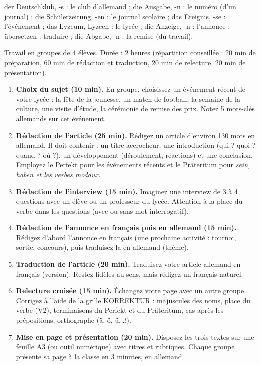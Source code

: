 \documentclass[11pt]{article}
\newcommand{\cle}[1]{{\popxbold\color{popdark}#1}}
\newcounter{popsec}
\newcounter{popsub}
\newcommand{\courssub}[1]{%
  \stepcounter{popsub}%
  \par\vspace{9pt}\noindent{\popxbold\fontsize{11.5}{13}\selectfont\color{popink}{\color{poporange}\thepopsec.\thepopsub}\hspace{6pt}#1}\par\nopagebreak\vspace{4pt}
}
\newcommand{\all}[1]{\ifmmode\text{\textit{#1}}\else\begingroup\selectlanguage{ngerman}\itshape #1\endgroup\fi}
\begin{document}
\begin{definition}
der Deutschklub, -s : le club d'allemand ; die Ausgabe, -n : le numéro (d'un journal) ; die Schülerzeitung, -en : le journal scolaire ; das Ereignis, -se : l'événement ; das Lyzeum, Lyzeen : le lycée ; die Anzeige, -n : l'annonce ; übersetzen : traduire ; die Abgabe, -n : la remise (du travail).
\end{definition}

\courssub{Consignes}

Travail en groupes de 4 élèves. Durée : 2 heures (répartition conseillée : 20 min de préparation, 60 min de rédaction et traduction, 20 min de relecture, 20 min de présentation).

\begin{enumerate}
\item \textbf{Choix du sujet (10 min).} En groupe, choisissez un événement récent de votre lycée : la fête de la jeunesse, un match de football, la semaine de la culture, une visite d'étude, la cérémonie de remise des prix. Notez 5 mots-clés allemands sur cet événement.
\item \textbf{Rédaction de l'article (25 min).} Rédigez un article d'environ 130 mots en allemand. Il doit contenir : un \cle{titre} accrocheur, une \cle{introduction} (qui ? quoi ? quand ? où ?), un \cle{développement} (déroulement, réactions) et une \cle{conclusion}. Employez le Perfekt pour les événements récents et le Präteritum pour \all{sein}, \all{haben} et les verbes modaux.
\item \textbf{Rédaction de l'interview (15 min).} Imaginez une interview de 3 à 4 questions avec un élève ou un professeur du lycée. Attention à la place du verbe dans les questions (avec ou sans mot interrogatif).
\item \textbf{Rédaction de l'annonce en français puis en allemand (15 min).} Rédigez d'abord l'annonce en français (une prochaine activité : tournoi, sortie, concours), puis traduisez-la en allemand (\cle{thème}).
\item \textbf{Traduction de l'article (20 min).} Traduisez votre article allemand en français (\cle{version}). Restez fidèles au sens, mais rédigez un français naturel.
\item \textbf{Relecture croisée (15 min).} Échangez votre page avec un autre groupe. Corrigez à l'aide de la grille KORREKTUR : majuscules des noms, place du verbe (V2), terminaisons du Perfekt et du Präteritum, cas après les prépositions, orthographe (ä, ö, ü, ß).
\item \textbf{Mise en page et présentation (20 min).} Disposez les trois textes sur une feuille A3 (ou outil numérique) avec titres et rubriques. Chaque groupe présente sa page à la classe en 3 minutes, en allemand.
\end{enumerate}
\end{document}
